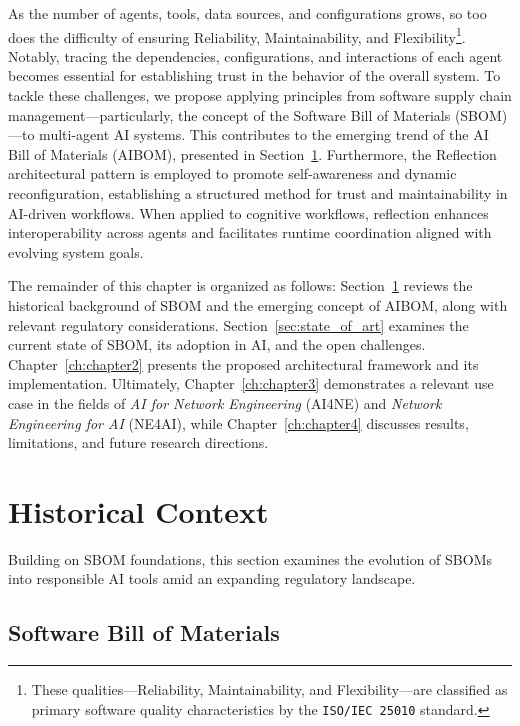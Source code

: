 As the number of agents, tools, data sources, and configurations grows, so too does the difficulty of ensuring Reliability, Maintainability, and Flexibility\footnote{These qualities—Reliability, Maintainability, and Flexibility—are classified as primary software quality characteristics by the \texttt{ISO/IEC 25010} standard.}. Notably, tracing the dependencies, configurations, and interactions of each agent becomes essential for establishing trust in the behavior of the overall system. To tackle these challenges, we propose applying principles from software supply chain management—particularly, the concept of the Software Bill of Materials (SBOM)—to multi-agent AI systems. This contributes to the emerging trend of the AI Bill of Materials (AIBOM), presented in Section~\ref{sec:historical_context}. Furthermore, the Reflection architectural pattern is employed to promote self-awareness and dynamic reconfiguration, establishing a structured method for trust and maintainability in AI-driven workflows. When applied to cognitive workflows, reflection enhances interoperability across agents and facilitates runtime coordination aligned with evolving system goals. 

The remainder of this chapter is organized as follows: Section~\ref{sec:historical_context} reviews the historical background of SBOM and the emerging concept of AIBOM, along with relevant regulatory considerations. Section~\ref{sec:state_of_art} examines the current state of SBOM, its adoption in AI, and the open challenges. Chapter~\ref{ch:chapter2} presents the proposed architectural framework and its implementation. Ultimately, Chapter~\ref{ch:chapter3} demonstrates a relevant use case in the fields of \textit{AI for Network Engineering} (AI4NE) and \textit{Network Engineering for AI} (NE4AI), while Chapter~\ref{ch:chapter4} discusses results, limitations, and future research directions.




\section{Historical Context} \label{sec:historical_context}
Building on SBOM foundations, this section examines the evolution of SBOMs into responsible AI tools amid an expanding regulatory landscape.

\subsection{Software Bill of Materials}

